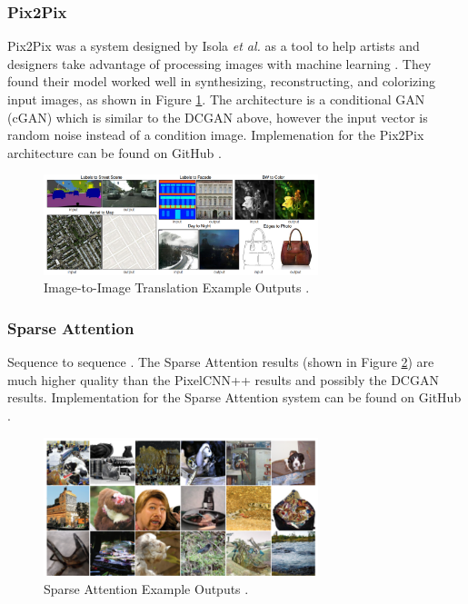 \documentclass[letterpaper]{article} %
\begin{document}
\subsubsection{Pix2Pix}
Pix2Pix was a system designed by Isola \textit{et al.} 
as a tool to help artists and designers take advantage of processing images with machine learning
\cite{image_to_image}.
They found their model worked well in synthesizing, reconstructing, and colorizing
input images, as shown in Figure \ref{fig:image_to_image}.
The architecture is a conditional GAN (cGAN) which is similar to the DCGAN above, however
the input vector is random noise instead of a condition image.
Implemenation for the Pix2Pix architecture can be found on GitHub
\cite{pix2pix_git}.

\begin{figure}[htbp]
\centerline{\includegraphics[width=8cm]{image_to_image.png}}
\caption{Image-to-Image Translation Example Outputs \cite{image_to_image}.}
\label{fig:image_to_image}
\end{figure}

\subsubsection{Sparse Attention}
Sequence to sequence \cite{generative_transformers}.
The Sparse Attention results (shown in Figure \ref{fig:sparse_attention}) are
much higher quality than the PixelCNN++ results and possibly
the DCGAN results.
Implementation for the Sparse Attention system can be found on GitHub
\cite{sparse_attention_git}.

\begin{figure}[htbp]
\centerline{\includegraphics[width=8cm]{sparse_attention.png}}
\caption{Sparse Attention Example Outputs \cite{generative_transformers}.}
\label{fig:sparse_attention}
\end{figure}
\end{document}
